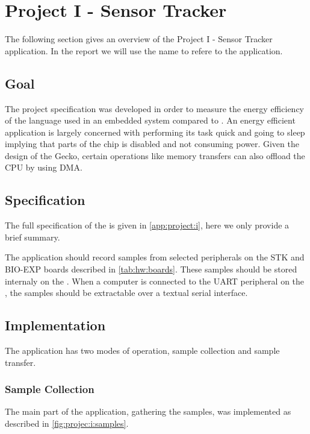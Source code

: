 \section{Project I - Sensor Tracker}
\label{sec:impl:project:i}

The following section gives an overview of the Project I - Sensor Tracker application.
In the report we will use the name {\tracker} to refere to the application.

\subsection{Goal}
The project specification was developed in order to measure the energy efficiency of the {\rust} language used in an embedded system compared to {\C}.
An energy efficient application is largely concerned with performing its task quick and going to sleep implying that parts of the chip is disabled and not consuming power.
Given the design of the Gecko, certain operations like memory transfers can also offload the CPU by using DMA.


\subsection{Specification}

The full specification of the {\tracker} is given in \autoref{app:project:i}, here we only provide a brief summary.

The application should record samples from selected peripherals on the STK and BIO-EXP boards described in \autoref{tab:hw:boards}.
These samples should be stored internaly on the {\gecko}.
When a computer is connected to the UART peripheral on the {\gecko}, the samples should be extractable over a textual serial interface.

\subsection{Implementation}

The application has two modes of operation, sample collection and sample transfer.

\subsubsection{Sample Collection}

The main part of the application, gathering the samples, was implemented as described in \autoref{fig:projec:i:samples}.

